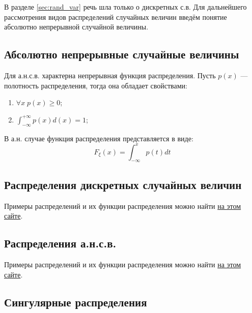 В разделе \ref{sec:rand_var} речь шла только о дискретных с.в. Для дальнейшего рассмотрения видов распределений случайных величин введём понятие абсолютно непрерывной случайной величины.

\subsection{Абсолютно непрерывные случайные величины}

Для а.н.с.в. характерна непрерывная функция распределения. Пусть $p(x)$ --- полотность распределения, тогда она обладает свойствами:
\begin{enumerate}
    \item $\forall x \; p(x) \geq 0$;
    \item $\int_{-\infty}^{+\infty} p(x) d(x) =1$;
\end{enumerate}

В а.н. случае функция распределения представляется в виде:
\begin{equation}
    F_\xi(x) = \int_{-\infty}^x p(t) dt
\end{equation}

\subsection{Распределения дискретных случайных величин}

Примеры распределений и их функции распределения можно найти \href{https://tvims.nsu.ru/chernova/tv/lec/node26.html}{на этом сайте}.

\subsection{Распределения а.н.с.в.}

Примеры распределений и их функции распределения можно найти \href{https://tvims.nsu.ru/chernova/tv/lec/node27.html}{на этом сайте}.

\subsection{Сингулярные распределения}

\newpage